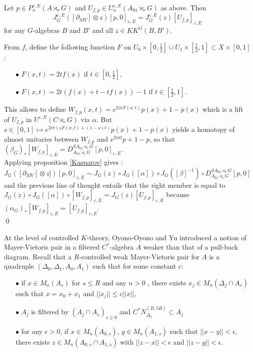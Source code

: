 \begin{lem}
Let $p\in P_n^{\varepsilon,E}(A\rtimes_r G)$ and $U_{f,p}\in U_n^{\varepsilon,E}(A_{01}\rtimes_r G)$ as above. Then
\[J^{\varepsilon, E}_G([\partial_{MV}]\otimes z ) [p,0]_{\varepsilon, E} = J^{\varepsilon, E}_G(z)[U_{f,p}]_{\varepsilon, E}\]
for any $G$-algebras $B$ and $B'$ and all $z\in KK^G(B,B')$.
\end{lem}

\begin{dem}
From $f$, define the following function $F$ on $U_0\times[0,\frac{1}{2}]\cup U_1\times [\frac{1}{2},1]\subset X\times[0,1]$: 
\begin{itemize}
\item[$\bullet$] $F(x,t)= 2t f(x)$ if $t\in [0,\frac{1}{2}]$,
\item[$\bullet$] $F(x,t)= 2t (f(x)+t-tf(x))-1$ if $t\in [\frac{1}{2},1]$.
\end{itemize} 
This allows to define $W_{f,p}(x,t)=e^{2i\pi F(x,t)}p(x)+1-p(x)$ which is a lift of $U_{f,p}$ in $U^{\varepsilon,E}( C \rtimes_r G)$ via $\alpha$.
But $s\in [0,1]\mapsto e^{2i\pi (sF(x,t)+(1-s)t)}p(x)+1-p(x)$ yields a homotopy of almost unitaries between $W_{f,p}$ and $e^{2i\pi t}p + 1-p$, so that $(\beta_G)_*[W_{f,p}]_{\varepsilon,E}=D_{A_{01}\rtimes_r G}^{SA_{01}\rtimes_r G} [p,0]_{\varepsilon,E}$.\\

Applying proposition \ref{Kasparov} gives : 
\[J_G([\partial_{MV}]\otimes z])[p,0]_{\varepsilon,E} \sim J_G(z)\circ J_G([\alpha])\circ J_G([\beta]^{-1}) \circ D_{A_{01}\rtimes_r G}^{SA_{01}\rtimes_r G} [p,0]  \]
and the previous line of thought entails that the right member is equal to $J_G(z)\circ J_G([\alpha]) \circ [W_{f,p}]_{\varepsilon,E} = J_G(z)[U_{f,p}]_{\varepsilon,E} $ because $(\alpha_G)_* [W_{f,p}]_{\varepsilon,E}=[U_{f,p}]_{\varepsilon,E} $.\\
\qed
\end{dem}

At the level of controlled $K$-theory, Oyono-Oyono and Yu introduced a notion of Mayer-Vietoris pair in a filtered $C^*$-algebra $A$ weaker than that of a pull-back diagram. Recall that a $R$-controlled weak Mayer-Vietoris pair for $A$ is a quadruple $(\Delta_0,\Delta_1,A_0,A_1)$ such that for some constant $c$:\\

\begin{itemize}
\item[$\bullet$] if $x\in M_n(A_s)$ for $s\leq R$ and any $n>0$ , there exists $x_j\in M_n(\Delta_j\cap A_s)$ such that $x=x_0+x_1$ and $||x_j||\leq c||x||$,
\item[$\bullet$] $A_j$ is filtered by $(A_j\cap A_s)_{s\geq 0}$ and $C^* N_{\Delta_j}^{(R,5R)}\subset A_j$
\item[$\bullet$] for any $\epsilon >0$, if $x\in M_n(A_{0,s})$, $y\in M_n(A_{1,s})$ such that $||x-y||<\epsilon$,  there exists $z\in M_n(A_{0,s}\cap A_{1,s})$ with $||z-x||<\epsilon$ and $||z-y||<\epsilon$. \\
\end{itemize}

